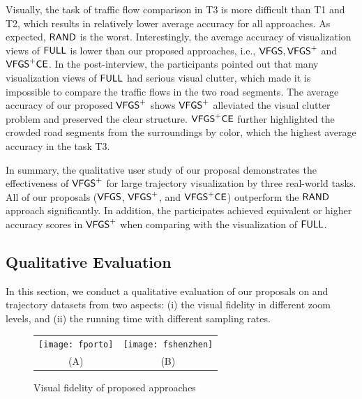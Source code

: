 

Visually, the task of traffic flow comparison in T3 is more difficult than T1 and T2, which results in relatively lower average accuracy for all approaches.  As expected, $\mathsf{RAND}$ is the worst.
Interestingly, the average accuracy of visualization views of $\mathsf{FULL}$ is lower than our proposed approaches, i.e., $\mathsf{VFGS},\mathsf{VFGS}^{+}$ and $\mathsf{VFGS}^{+}\mathsf{CE}$.
In the post-interview, the participants pointed out that many visualization views of $\mathsf{FULL}$ had serious visual clutter,
which made it is impossible to compare the traffic flows in the two road segments.
The average accuracy of our proposed $\mathsf{VFGS}^{+}$ shows $\mathsf{VFGS}^{+}$ alleviated the visual clutter problem and preserved the clear structure.
$\mathsf{VFGS}^{+}\mathsf{CE}$ further highlighted the crowded road segments from the surroundings by color, which  the highest average accuracy in the task T3.

In summary, the qualitative user study of our proposal demonstrates the effectiveness of $\mathsf{VFGS}^{+}$ for large trajectory visualization by three real-world tasks.
All of our proposals ($\mathsf{VFGS}$, $\mathsf{VFGS}^{+}$, and $\mathsf{VFGS}^{+}\mathsf{CE}$) outperform the $\mathsf{RAND}$ approach significantly.
In addition, the participates achieved equivalent or higher accuracy scores in $\mathsf{VFGS}^{+}$ when comparing with the visualization of $\mathsf{FULL}$.


\subsection{Qualitative Evaluation}\label{sec:quality}
In this section, we conduct a qualitative evaluation of our proposals on \pt{} and \sz{} trajectory datasets from two aspects: (i) the visual fidelity in different zoom levels,
and (ii) the running time with different sampling rates.

\begin{figure}
 \centering
 \small
 \begin{tabular}{cc}
   \texttt{[image: fporto]}
   &
   \texttt{[image: fshenzhen]}
   \\
   (A) \pt{}
   &
   (B) \sz{}
 \end{tabular}
 \vspace{-2mm}
 \caption{Visual fidelity of proposed approaches}
 \label{fig:fidelity}
 \vspace{-4mm}
\end{figure}

